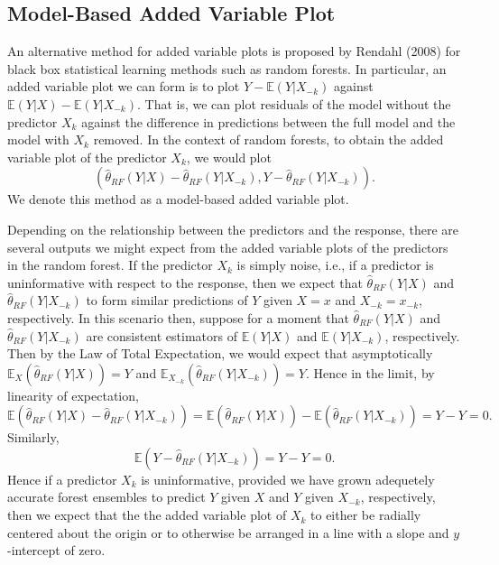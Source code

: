\documentclass[12pt,twoside]{reedthesis}
\theoremstyle{definition}
\theoremstyle{definition}
\theoremstyle{definition}
\theoremstyle{remark}
\begin{document}
\subsection{Model-Based Added Variable
Plot}\label{model-based-added-variable-plot}

An alternative method for added variable plots is proposed by Rendahl
(2008) for black box statistical learning methods such as random
forests. In particular, an added variable plot we can form is to plot
\(Y-\mathbb{E}(Y|X_{-k})\) against
\(\mathbb{E}(Y|X)-\mathbb{E}(Y|X_{-k})\). That is, we can plot residuals
of the model without the predictor \(X_k\) against the difference in
predictions between the full model and the model with \(X_k\) removed.
In the context of random forests, to obtain the added variable plot of
the predictor \(X_k\), we would plot
\[(\hat{\theta}_{RF}(Y|X)-\hat{\theta}_{RF}(Y|X_{-k}), Y-\hat{\theta}_{RF}(Y|X_{-k})).\]
We denote this method as a model-based added variable plot. \par

Depending on the relationship between the predictors and the response,
there are several outputs we might expect from the added variable plots
of the predictors in the random forest. If the predictor \(X_k\) is
simply noise, i.e., if a predictor is uninformative with respect to the
response, then we expect that \(\hat{\theta}_{RF}(Y|X)\) and
\(\hat{\theta}_{RF}(Y|X_{-k})\) to form similar predictions of \(Y\)
given \(X=x\) and \(X_{-k}=x_{-k}\), respectively. In this scenario
then, suppose for a moment that \(\hat{\theta}_{RF}(Y|X)\) and
\(\hat{\theta}_{RF}(Y|X_{-k})\) are consistent estimators of
\(\mathbb{E}(Y|X)\) and \(\mathbb{E}(Y|X_{-k})\), respectively. Then by
the Law of Total Expectation, we would expect that asymptotically
\(\mathbb{E}_X(\hat{\theta}_{RF}(Y|X))=Y\) and
\(\mathbb{E}_{X_{-k}}(\hat{\theta}_{RF}(Y|X_{-k}))=Y\). Hence in the
limit, by linearity of expectation,
\[\mathbb{E}(\hat{\theta}_{RF}(Y|X)-\hat{\theta}_{RF}(Y|X_{-k}))=\mathbb{E}(\hat{\theta}_{RF}(Y|X))-\mathbb{E}(\hat{\theta}_{RF}(Y|X_{-k}))=Y-Y=0.\]
Similarly, \[\mathbb{E}(Y-\hat{\theta}_{RF}(Y|X_{-k}))=Y-Y=0.\] Hence if
a predictor \(X_k\) is uninformative, provided we have grown adequetely
accurate forest ensembles to predict \(Y\) given \(X\) and \(Y\) given
\(X_{-k}\), respectively, then we expect that the the added variable
plot of \(X_k\) to either be radially centered about the origin or to
otherwise be arranged in a line with a slope and \(y\)-intercept of
zero. \par
\end{document}
